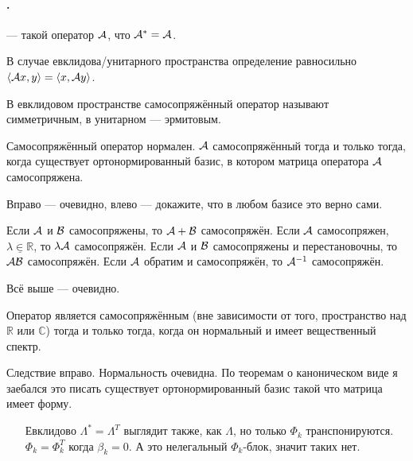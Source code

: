 \documentclass{article}
\begin{document}
    \paragraph{.}
    \begin{itemize}
        \dfn {} --- такой оператор ${\mathcal{A}}$, что ${\mathcal{A}}^*={\mathcal{A}}$.
        \begin{Comment}
            В случае евклидова/унитарного пространства определение равносильно ${\left\langle{{\mathcal{A}}x},{y}\right\rangle}={\left\langle{x},{{\mathcal{A}} y}\right\rangle}$.
        \end{Comment}
        \begin{Comment}
            В евклидовом пространстве самосопряжённый оператор называют симметричным, в унитарном --- эрмитовым.
        \end{Comment}
        \thm Самосопряжённый оператор нормален.
        \thm ${\mathcal{A}}$ самосопряжённый тогда и только тогда, когда существует ортонормированный базис, в котором матрица оператора ${\mathcal{A}}$ самосопряжена.
        \begin{Proof}
            Вправо --- очевидно, влево --- докажите, что в любом базисе это верно сами.
        \end{Proof}
        \thm Если ${\mathcal{A}}$ и ${\mathcal{B}}$ самосопряжены, то ${\mathcal{A}}+{\mathcal{B}}$ самосопряжён.
        \thm Если ${\mathcal{A}}$ самосопряжен, $\underline{\lambda\in\mathbb R}$, то $\lambda{\mathcal{A}}$ самосопряжён.
        \thm Если ${\mathcal{A}}$ и ${\mathcal{B}}$ самосопряжены и перестановочны, то ${\mathcal{A}}{\mathcal{B}}$ самосопряжён.
        \thm Если ${\mathcal{A}}$ обратим и самосопряжён, то ${\mathcal{A}}^{-1}$ самосопряжён.
        \begin{Proof}
            Всё выше --- очевидно.
        \end{Proof}
        \thm Оператор является самосопряжённым (вне зависимости от того, пространство над $\mathbb R$ или $\mathbb C$) тогда и только тогда, когда он нормальный и имеет вещественный спектр.
        \begin{Proof}
            Следствие вправо. Нормальность очевидна. По теоремам о каноническом виде я заебался это писать существует ортонормированный базис такой что матрица имеет форму.
            \begin{itemize}
                \item[Евклидово] $\Lambda^*=\Lambda^T$ выглядит также, как $\Lambda$, но только $\Phi_k$ транспонируются. $\Phi_k=\Phi_k^T$ когда $\beta_k=0$. А это нелегальный $\Phi_k$-блок, значит таких нет.

\end{itemize}
\end{Proof}
\end{itemize}
\end{document}
